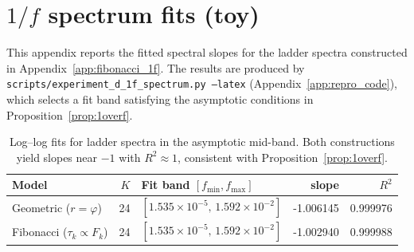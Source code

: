 \section{\texorpdfstring{$1/f$}{1/f} spectrum fits (toy)}
\label{app:1f_fit_table}

This appendix reports the fitted spectral slopes for the ladder spectra constructed in Appendix~\ref{app:fibonacci_1f}. The results are produced by \texttt{scripts/experiment\_d\_1f\_spectrum.py --latex} (Appendix~\ref{app:repro_code}), which selects a fit band satisfying the asymptotic conditions in Proposition~\ref{prop:1overf}.

\begin{table}[H]
\centering
\begin{tabular}{l r l r r}
\toprule
Model & $K$ & Fit band $[f_{\min},f_{\max}]$ & slope & $R^2$ \\
\midrule
Geometric ($r=\varphi$) & 24 & $[1.535\times 10^{-5},\,1.592\times 10^{-2}]$ & -1.006145 & 0.999976 \\
Fibonacci ($\tau_k\propto F_k$) & 24 & $[1.535\times 10^{-5},\,1.592\times 10^{-2}]$ & -1.002940 & 0.999988 \\
\bottomrule
\end{tabular}
\caption{Log--log fits for ladder spectra in the asymptotic mid-band. Both constructions yield slopes near $-1$ with $R^2\approx 1$, consistent with Proposition~\ref{prop:1overf}.}
\label{tab:1f_fit}
\end{table}


